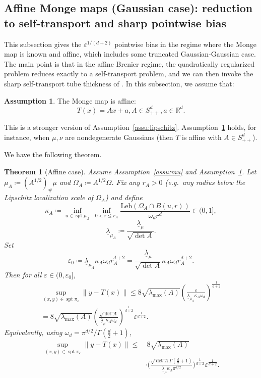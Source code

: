 \documentclass{article}
\theoremstyle{plain}
\newtheorem{theorem}{Theorem}[section]
\theoremstyle{definition}
\newtheorem{assumption}{Assumption}
\theoremstyle{remark}
\numberwithin{equation}{section}
\DeclareMathOperator{\spt}{spt}
\newcommand{\R}{\mathbb{R}}
\newcommand{\Leb}{\mathrm{Leb}}
\begin{document}
\subsection{Affine Monge maps (Gaussian case): reduction to self-transport and sharp pointwise bias}\label{sec:affine-known-monge}
This subsection gives the $\varepsilon^{1/(d+2)}$ pointwise bias in the regime where the Monge map is known and affine, which includes some truncated Gaussian-Gaussian case.
The main point is that in the affine Brenier regime, the quadratically regularized problem reduces exactly to a self-transport problem, and we can then invoke the sharp self-transport tube thickness of \citet{wiesel2025sparsity}. 
In this subsection, we assume that:
\begin{assumption}\label{assu:affine-Monge-map}
The Monge map is affine:
\[
T(x)=Ax+a,A\in S^d_{++},a\in\R^d.
\]
\end{assumption}
This is a stronger version of Assumption~\ref{assu:lipschitz}.
Assumption~\ref{assu:affine-Monge-map} holds, for instance, when $\mu,\nu$ are nondegenerate Gaussians (then $T$ is affine with $A\in S^d_{++}$). 

We have the following theorem.
\begin{theorem}[Affine case]\label{thm:affine-sharp-pointwise}
Assume Assumption~\ref{assu:mu} and Assumption~\ref{assu:affine-Monge-map}.
Let $\mu_A\coloneqq(A^{1/2})_\#\mu$ and $\Omega_A\coloneqq A^{1/2}\Omega$.
Fix any $r_A>0$ (e.g.\ any radius below the Lipschitz localization scale of $\Omega_A$) and define
$$
\kappa_A\coloneqq\inf_{u\in\spt\mu_A}\ \inf_{0<r\le r_A}\frac{\Leb(\Omega_A\cap B(u,r))}{\omega_dr^d}\in(0,1],
$$
$$
\underline\lambda_{\mu_A}\coloneqq\frac{\underline\lambda_\mu}{\sqrt{\det A}}.
$$
Set
$$
\varepsilon_0\coloneqq\underline\lambda_{\mu_A}\kappa_A\omega_dr_A^{d+2}=\frac{\underline\lambda_\mu}{\sqrt{\det A}}\kappa_A\omega_dr_A^{d+2}.
$$
Then for all $\varepsilon\in(0,\varepsilon_0]$,
\begin{multline}\label{eqn:affine-sharp-pointwise-bias-explicit}
\sup_{(x,y)\in\spt\pi_\varepsilon}\|y-T(x)\|\le8\sqrt{\lambda_{\max}(A)}\left(\frac{\varepsilon}{\underline\lambda_{\mu_A}\kappa_A\omega_d}\right)^{\frac{1}{d+2}}\\
=8\sqrt{\lambda_{\max}(A)}\left(\frac{\sqrt{\det A}}{\underline\lambda_\mu\kappa_A\omega_d}\right)^{\frac{1}{d+2}}\varepsilon^{\frac{1}{d+2}}.
\end{multline}
Equivalently, using $\omega_d=\pi^{d/2}/\Gamma(\frac d2+1)$,
$$
\begin{aligned}
\sup_{(x,y)\in\spt\pi_\varepsilon}\|y-T(x)\|\le&\ 8\sqrt{\lambda_{\max}(A)}\\
&\cdot\Big(\frac{\sqrt{\det A}\Gamma(\frac d2+1)}{\underline\lambda_\mu\kappa_A\pi^{d/2}}\Big)^{\frac{1}{d+2}}\varepsilon^{\frac{1}{d+2}}.
\end{aligned}
$$
\end{theorem}
\end{document}
